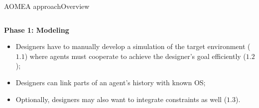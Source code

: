 \begin{frame}{AOMEA approach}{Overview}

    \begin{columns}

        \begin{column}{0.5\textwidth}

            \textbf{Phase 1: Modeling}

            \begin{itemize}
                \item Designers have to manually develop a simulation of the target environment ($1.1$) where agents must cooperate to achieve the designer's goal efficiently ($1.2$);
                \item Designers can link parts of an agent's history with known OS;
                \item Optionally, designers may also want to integrate constraints as well ($1.3$).
            \end{itemize}

        \end{column}


\end{columns}
\end{frame}
